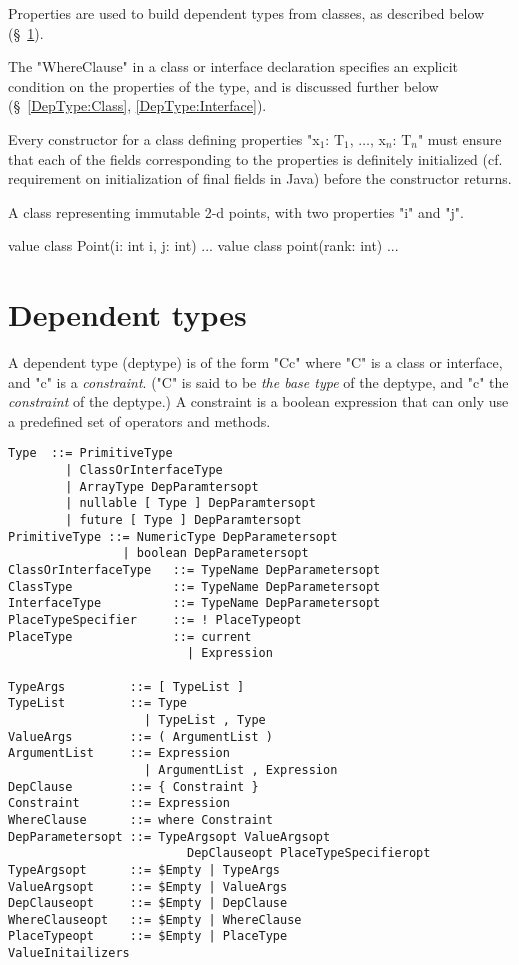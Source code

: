 Properties are used to build dependent types from classes, as
described below (\S~\ref{DepType:DepType}).

The \xcd"WhereClause" in a class or interface declaration specifies an
explicit condition on the properties of the type, and is discussed further
below (\S~\ref{DepType:Class}, \ref{DepType:Interface}).

\begin{staticrule*}
     Every constructor for a class defining
   properties \xcdmath"x$_1$: T$_1$, $\ldots$, x$_n$: T$_n$" must ensure that each of the fields
   corresponding to the properties is definitely initialized
   (cf. requirement on initialization of final fields in Java) before the
   constructor returns.  
\end{staticrule*}


\begin{example}
 A class representing immutable 2-d points, with two properties \xcd"i" and 
\xcd"j".
\begin{xten}
value class Point(i: int i, j: int) { ... }
value class point(rank: int) { ... }
\end{xten}
  
\end{example}

\section{Dependent types}\label{DepType:DepType}

A dependent type (deptype) is of the form \xcd"C{c}" where \xcd"C" is a class
or interface, and \xcd"c" is a {\em constraint}. (\xcd"C" is said to be 
{\em the base type} of the deptype, and \xcd"c" the {\em constraint} of the deptype.)  A
constraint is a boolean expression that can only use a predefined set
of operators and methods. 

\begin{verbatim}
Type  ::= PrimitiveType
        | ClassOrInterfaceType
        | ArrayType DepParamtersopt
        | nullable [ Type ] DepParamtersopt
        | future [ Type ] DepParamtersopt
PrimitiveType ::= NumericType DepParametersopt
                | boolean DepParametersopt
ClassOrInterfaceType   ::= TypeName DepParametersopt
ClassType              ::= TypeName DepParametersopt
InterfaceType          ::= TypeName DepParametersopt
PlaceTypeSpecifier     ::= ! PlaceTypeopt
PlaceType              ::= current
                         | Expression

TypeArgs         ::= [ TypeList ]
TypeList         ::= Type
                   | TypeList , Type
ValueArgs        ::= ( ArgumentList )
ArgumentList     ::= Expression
                   | ArgumentList , Expression
DepClause        ::= { Constraint }
Constraint       ::= Expression
WhereClause      ::= where Constraint
DepParametersopt ::= TypeArgsopt ValueArgsopt
                         DepClauseopt PlaceTypeSpecifieropt
TypeArgsopt      ::= $Empty | TypeArgs
ValueArgsopt     ::= $Empty | ValueArgs
DepClauseopt     ::= $Empty | DepClause
WhereClauseopt   ::= $Empty | WhereClause
PlaceTypeopt     ::= $Empty | PlaceType
ValueInitailizers
\end{verbatim}

